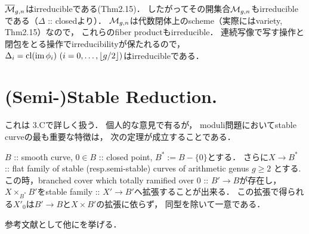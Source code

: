 \documentclass[a4paper]{jsarticle}
\begin{document}
    $\overline{\mathcal{M}}_{g,n}$はirreducibleである(Thm2.15)．
    したがってその開集合$\mathcal{M}_{g,n}$もirreducibleである（$\Delta$ :: closedより）．
    $\mathcal{M}_{g,n}$は代数閉体上のscheme（実際にはvariety, Thm2.15）なので，
    これらのfiber productもirreducible．
    連続写像で写す操作と閉包をとる操作でirreducibilityが保たれるので，
    $\Delta_i=\operatorname{cl}(\operatorname{im} \phi_i) \ (i=0,\dots,\lfloor g/2 \rfloor)$はirreducibleである．

\section{(Semi-)Stable Reduction.}
    これは\cite{HaMo} 3.Cで詳しく扱う．
    個人的な意見で有るが，
    moduli問題においてstable curveの最も重要な特徴は，
    次の定理が成立することである．

\begin{Thm}
    $B$ :: smooth curve, $0 \in B$ :: closed point, $B^*:=B-\{0\}$とする．
    さらに$X \to B^*$ :: flat family of stable (resp.semi-stable) curves of arithmetic genus $g \geq 2$
    とする.
    この時，branched cover which totally ramified over $0$ :: $B' \to B$が存在し，
    $X \times_{B^*} B'$をstable family :: $X' \to B'$へ拡張することが出来る．
    この拡張で得られる$X'_{0}$は$B' \to B$と$X \times B'$の拡張に依らず，
    同型を除いて一意である．
\end{Thm}
    参考文献として他に\cite{TourStableRed}を挙げる．
\end{document}
